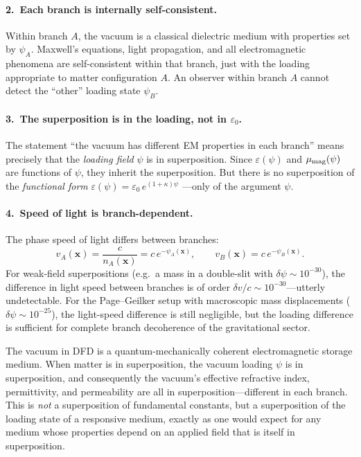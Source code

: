 \documentclass[11pt,a4paper]{article}
\begin{document}
\paragraph{2.\ Each branch is internally self-consistent.}
Within branch $A$, the vacuum is a classical dielectric medium with
properties set by $\psi_A$.  Maxwell's equations, light propagation, and all
electromagnetic phenomena are self-consistent within that branch, just with
the loading appropriate to matter configuration $A$.  An observer within
branch $A$ cannot detect the ``other'' loading state $\psi_B$.

\paragraph{3.\ The superposition is in the loading, not in $\varepsilon_0$.}
The statement ``the vacuum has different EM properties in each branch'' means
precisely that the \emph{loading field} $\psi$ is in superposition.  Since
$\varepsilon(\psi)$ and $\mu_{\rm mag}(\psi)$ are functions of $\psi$, they
inherit the superposition.  But there is no superposition of the
\emph{functional form} $\varepsilon(\psi) = \varepsilon_0\, e^{(1+\kappa)\psi}$
---only of the argument $\psi$.

\paragraph{4.\ Speed of light is branch-dependent.}
The phase speed of light differs between branches:
\begin{equation}
v_A(\mathbf{x}) = \frac{c}{n_A(\mathbf{x})} = c\,e^{-\psi_A(\mathbf{x})},
\qquad
v_B(\mathbf{x}) = c\,e^{-\psi_B(\mathbf{x})}.
\end{equation}
For weak-field superpositions (e.g.\ a mass in a double-slit with
$\delta\psi \sim 10^{-30}$), the difference in light speed between branches
is of order $\delta v/c \sim 10^{-30}$---utterly undetectable.  For the
Page--Geilker setup with macroscopic mass displacements ($\delta\psi \sim
10^{-25}$), the light-speed difference is still negligible, but the loading
difference is sufficient for complete branch decoherence of the gravitational
sector.

\begin{tcolorbox}[colback=blue!5, colframe=blue!50!black,
title=Physical Summary: Branch-by-Branch Loading]
The vacuum in DFD is a quantum-mechanically coherent electromagnetic
storage medium.  When matter is in superposition, the vacuum loading
$\psi$ is in superposition, and consequently the vacuum's effective
refractive index, permittivity, and permeability are all in
superposition---different in each branch.  This is \emph{not} a
superposition of fundamental constants, but a superposition of the
loading state of a responsive medium, exactly as one would expect for
any medium whose properties depend on an applied field that is itself
in superposition.
\end{tcolorbox}
\end{document}
